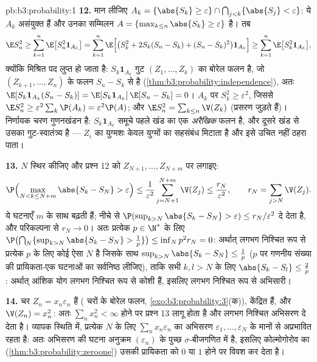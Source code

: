 \begin{solution}{pb:b3:probability:1}
\textbf{12.} मान लीजिए $A_k = \{\abs{S_k} \geq \varepsilon\}
\cap \bigcap_{j<k}\{\abs{S_j} < \varepsilon\}$: ये $A_k$
असंयुक्त हैं और उनका सम्मिलन $A = \{\max_{k\leq
n}\abs{S_k} \geq \varepsilon\}$ है। तब
\[
\E S_n^2 \geq \sum_{k=1}^n\E\bigl[S_n^2\mathbf 1_{A_k}\bigr]
= \sum_{k=1}^n\E\Bigl[\bigl(S_k^2 + 2S_k(S_n - S_k) + (S_n
- S_k)^2\bigr)\mathbf 1_{A_k}\Bigr]
\geq \sum_{k=1}^n\E\bigl[S_k^2\mathbf 1_{A_k}\bigr],
\]
क्योंकि मिश्रित पद लुप्त हो जाता है: $S_k\mathbf 1_{A_k}$
गुट $(Z_1, \dots, Z_k)$ का बोरेल फलन है, जो $(Z_{k+1},
\dots, Z_n)$ के फलन $S_n - S_k$ से  है
(\cref{thm:b3:probability:independence}), अतः
$\E[S_k\mathbf 1_{A_k}(S_n - S_k)] = \E[S_k\mathbf
1_{A_k}]\,\E[S_n - S_k] = 0$। $A_k$ पर $S_k^2 \geq
\varepsilon^2$, जिससे $\E S_n^2 \geq
\varepsilon^2\sum_k\P(A_k) = \varepsilon^2\P(A)$; और $\E
S_n^2 = \sum_{k\leq n}\V(Z_k)$ (प्रसरण जुड़ते हैं)।
निर्णायक चरण गुणनखंडन है: $S_k\mathbf 1_{A_k}$ समूचे पहले
खंड का एक \emph{अरैखिक} फलन है, और दूसरे खंड से उसका
 गुट-स्वातंत्र्य है --- $Z_i$ का युग्मशः
 केवल युग्मों का सहसंबंध मिटाता है और इसे उचित
नहीं ठहरा पाता।

\textbf{13.} $N$ स्थिर कीजिए और प्रश्न 12 को $Z_{N+1},
\dots, Z_{N+m}$ पर लगाइए:
\[
\P\Bigl(\max_{N < k \leq N+m}\abs{S_k - S_N} >
\varepsilon\Bigr) \leq
\frac1{\varepsilon^2}\sum_{j=N+1}^{N+m}\V(Z_j) \leq
\frac{r_N}{\varepsilon^2},
\qquad r_N = \sum_{j>N}\V(Z_j) .
\]
ये घटनाएँ $m$ के साथ बढ़ती हैं; नीचे से 
$\P(\sup_{k>N}\abs{S_k - S_N} > \varepsilon) \leq
r_N/\varepsilon^2$ दे देता है, और परिकल्पना से $r_N \to 0$।
अतः प्रत्येक $p \in \N^*$ के लिए $\P\bigl(\bigcap_N\{\sup_{k>N}
\abs{S_k - S_N} > \frac1p\}\bigr) \leq \inf_Np^2r_N = 0$:
अर्थात् लगभग निश्चित रूप से प्रत्येक $p$ के लिए कोई ऐसा $N$
है जिसके साथ $\sup_{k>N}\abs{S_k - S_N} \leq \frac1p$ ($p$
पर गणनीय संख्या की प्रायिकता-एक घटनाओं का सर्वनिष्ठ लीजिए),
ताकि सभी $k, l > N$ के लिए $\abs{S_k -
S_l} \leq \frac2p$: अर्थात् आंशिक योग लगभग निश्चित रूप से
कोशी हैं, इसलिए लगभग निश्चित रूप से अभिसारी।

\textbf{14.} चर $Z_n = x_n\varepsilon_n$  हैं
( चरों के बोरेल फलन,
\cref{exo:b3:probability:3}(क)), केंद्रित हैं, और $\V(Z_n) =
x_n^2$: अतः $\sum_nx_n^2 < \infty$ होने पर प्रश्न 13 लागू
होता है और लगभग निश्चित अभिसरण दे देता है। व्यापक स्थिति में,
प्रत्येक $N$ के लिए $\sum_nx_n\varepsilon_n$ का अभिसरण
$\varepsilon_1, \dots, \varepsilon_N$ के मानों से अप्रभावित
रहता है: अतः अभिसरण की घटना  अनुक्रम
$(\varepsilon_n)$ के पुच्छ $\sigma$-बीजगणित में है, इसलिए
कोल्मोगोरोव का 
(\cref{thm:b3:probability:zeroone}) उसकी प्रायिकता को $0$ या
$1$ होने पर विवश कर देता है।


\end{solution}
